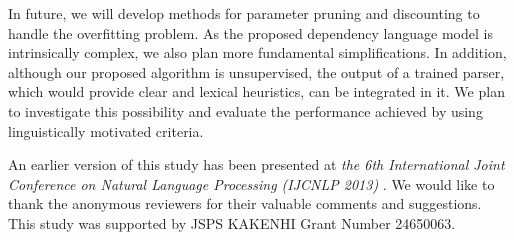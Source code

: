 \documentclass[english]{jnlp_1.4}
\begin{document}
In future, we will develop methods for parameter pruning and discounting to handle the overfitting problem. As the proposed dependency language model is intrinsically complex, we also plan more fundamental simplifications. In addition, although our proposed algorithm is unsupervised, the output of a trained parser, which would provide clear and lexical heuristics, can be integrated in it. We plan to investigate this possibility and evaluate the performance achieved by using linguistically motivated criteria.


\acknowledgment

An earlier version of this study has been presented at {\it the 6th International Joint Conference on Natural Language Processing (IJCNLP 2013)} \cite{ding-yamamoto:2013:IJCNLP}. We would like to thank the anonymous reviewers for their valuable comments and suggestions. This study was supported by JSPS KAKENHI Grant Number 24650063.
\end{document}
